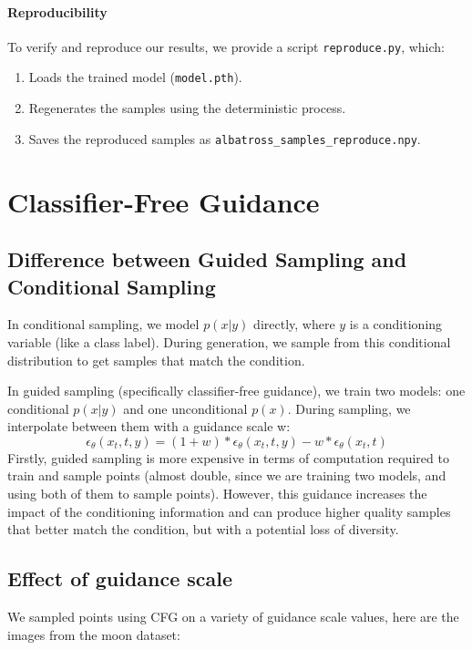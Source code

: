 \documentclass[a4paper,12pt]{article}
\begin{document}
\paragraph{Reproducibility}  
To verify and reproduce our results, we provide a script \texttt{reproduce.py}, which:  
\begin{enumerate}
    \item Loads the trained model (\texttt{model.pth}).
    \item Regenerates the samples using the deterministic process.
    \item Saves the reproduced samples as \texttt{albatross\_samples\_reproduce.npy}.
\end{enumerate} 

\section*{Classifier-Free Guidance}

\subsection*{Difference between Guided Sampling and Conditional Sampling}
In conditional sampling, we model $p(x|y)$ directly, where $y$ is a conditioning variable (like a class label). During generation, we sample from this conditional distribution to get samples that match the condition.

In guided sampling (specifically classifier-free guidance), we train two models: one conditional $p(x|y)$ and one unconditional $p(x)$. During sampling, we interpolate between them with a guidance scale w:
\[\epsilon_\theta(x_t, t, y) = (1+w) * \epsilon_\theta(x_t, t, y) - w * \epsilon_\theta(x_t, t)\]
Firstly, guided sampling is more expensive in terms of computation required to train and sample points (almost double, since we are training two models, and using both of them to sample points). However, this guidance increases the impact of the conditioning information and can produce higher quality samples that better match the condition, but with a potential loss of diversity.

\subsection*{Effect of guidance scale}
We sampled points using CFG on a variety of guidance scale values, here are the images from the moon dataset:
\end{document}
